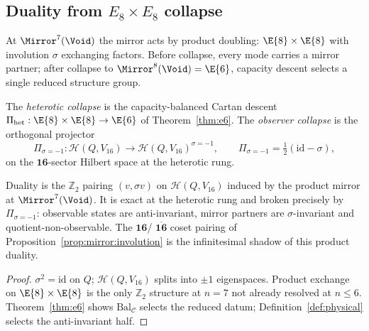 \subsection{Duality from $E_8\times E_8$ collapse}
\label{sec:observer:duality}

At $\Mirror^7(\Void)$ the mirror acts by product doubling:
$\E{8}\times\E{8}$ with involution $\sigma$ exchanging factors. Before
collapse, every mode carries a mirror partner; after collapse to
$\Mirror^8(\Void)=\E{6}$, capacity descent selects a single reduced structure
group.

\begin{definition}\label{def:heterotic-collapse}
The \emph{heterotic collapse} is the capacity-balanced Cartan descent
$\Pi_{\mathrm{het}}:\E{8}\times\E{8}\to\E{6}$ of Theorem~\ref{thm:e6}.
The \emph{observer collapse} is the orthogonal projector
\begin{equation}\label{eq:collapse-observer}
  \Pi_{\sigma=-1}: \mathcal{H}(Q,V_{16}) \to \mathcal{H}(Q,V_{16})^{\sigma=-1},
  \qquad
  \Pi_{\sigma=-1}=\tfrac12(\mathrm{id}-\sigma),
\end{equation}
on the $\mathbf{16}$-sector Hilbert space at the heterotic rung.
\end{definition}

\begin{theorem}\label{thm:duality}
Duality is the $\mathbb{Z}_2$ pairing $(v,\sigma v)$ on
$\mathcal{H}(Q,V_{16})$ induced by the product mirror at
$\Mirror^7(\Void)$. It is exact at the heterotic rung and broken precisely by
$\Pi_{\sigma=-1}$: observable states are anti-invariant, mirror partners are
$\sigma$-invariant and quotient-non-observable. The $\mathbf{16}$/
$\overline{\mathbf{16}}$ coset pairing of Proposition~\ref{prop:mirror:involution}
is the infinitesimal shadow of this product duality.
\end{theorem}

\begin{proof}
$\sigma^2=\mathrm{id}$ on $Q$; $\mathcal{H}(Q,V_{16})$ splits into
$\pm1$ eigenspaces. Product exchange on $\E{8}\times\E{8}$ is the only
$\mathbb{Z}_2$ structure at $n=7$ not already resolved at $n\leq6$.
Theorem~\ref{thm:e6} shows $\mathrm{Bal}_{\mathcal{C}}$ selects the reduced
datum; Definition~\ref{def:physical} selects the anti-invariant half.
\end{proof}

